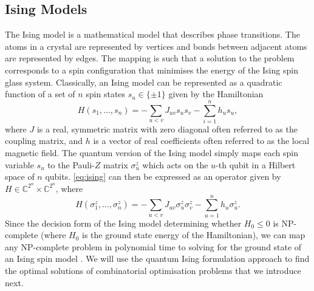 \subsection{Ising Models}

    The Ising model is a mathematical model that describes phase transitions. The atoms in a crystal are represented by vertices and bonds between adjacent atoms are represented by edges. The mapping is such that a solution to the problem corresponds to a spin configuration that minimises the energy of the Ising spin glass system. Classically, an Ising model can be represented as a quadratic function of a set of $n$ spin states $s_u\in\{\pm1\}$ given by the Hamiltonian 
    \begin{equation} \label{eq:ising}
        H(s_1,\dots,s_n) = -\sum_{u<v}J_{uv}s_us_v-\sum^n_{i=1}h_us_u,
    \end{equation}
    where $J$ is a real, symmetric matrix with zero diagonal often referred to as the coupling matrix, and $h$ is a vector of real coefficients often referred to as the local magnetic field. The quantum version of the Ising model simply maps each spin variable $s_u$ to the Pauli-$Z$ matrix $\sigma_u^z$ which acts on the $u$-th qubit in a Hilbert space of $n$ qubits. \eqref{eq:ising} can then be expressed as an operator given by $H\in \mathbb{C}^{2^n}\times \mathbb{C}^{2^n}$, where
    \begin{equation} \label{eq:ising_quantum}
        H(\sigma^z_1,\dots,\sigma^z_n) = -\sum_{u<v}J_{uv}\sigma^z_u\sigma^z_v-\sum^n_{u=1}h_u\sigma^z_u.
    \end{equation}
    Since the decision form of the Ising model determining whether $H_0\leq 0$ is NP-complete \cite{barahona1982computational} (where $H_0$ is the ground state energy of the Hamiltonian), we can map any NP-complete problem in polynomial time to solving for the ground state of an Ising spin model \cite{lucas2014ising}. We will use the quantum Ising formulation approach \cite{kirkpatrick1983optimization} to find the optimal solutions of combinatorial optimisation problems that we introduce next.


    


